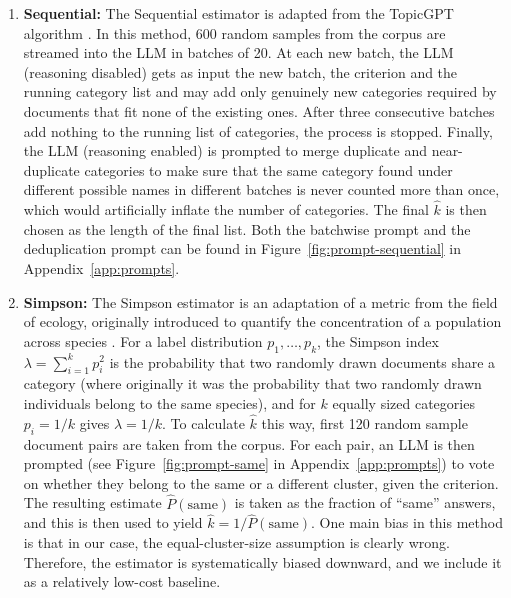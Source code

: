 \documentclass[11pt,a4paper,oneside]{report}
\begin{document}
\begin{enumerate}
From the pooled nine votes at each grid level, the share of ``no'' answers is calculated. This fraction represents the proportion of merges at that granularity the LLM considers ``unjustified''. This share is expected to be high at low $k$, where merges join unrelated categories, and low at high $k$, where merges join fragments of the same category.

Finally, a logistic curve of this fraction against $\log k$ is fitted and the final $\hat{k}$ is chosen to be the point where it crosses 50\% (which is then rounded and clipped to the nearest $k$ in the grid range). This $\hat{k}$ can therefore be thought of as the point between where the LLM believes the clustering is too granular and where it thinks it is not granular enough, which is by construction the point of optimal granularity.
\item \textbf{Sequential:} The Sequential estimator is adapted from the TopicGPT algorithm \citep{pham2024topicgpt}. In this method, 600 random samples from the corpus are streamed into the LLM in batches of 20. At each new batch, the LLM (reasoning disabled) gets as input the new batch, the criterion and the running category list and may add only genuinely new categories required by documents that fit none of the existing ones. After three consecutive batches add nothing to the running list of categories, the process is stopped. Finally, the LLM (reasoning enabled) is prompted to merge duplicate and near-duplicate categories to make sure that the same category found under different possible names in different batches is never counted more than once, which would artificially inflate the number of categories. The final $\hat{k}$ is then chosen as the length of the final list. Both the batchwise prompt and the deduplication prompt can be found in Figure~\ref{fig:prompt-sequential} in Appendix~\ref{app:prompts}.
\item \textbf{Simpson:} The Simpson estimator is an adaptation of a metric from the field of ecology, originally introduced to quantify the concentration of a population across species \citep{simpson1949measurement}. For a label distribution $p_1, \ldots, p_k$, the Simpson index $\lambda = \sum_{i=1}^{k} p_i^2$ is the probability that two randomly drawn documents share a category (where originally it was the probability that two randomly drawn individuals belong to the same species), and for $k$ equally sized categories $p_i = 1/k$ gives $\lambda = 1/k$. To calculate $\hat{k}$ this way, first 120 random sample document pairs are taken from the corpus. For each pair, an LLM is then prompted (see Figure~\ref{fig:prompt-same} in Appendix~\ref{app:prompts}) to vote on whether they belong to the same or a different cluster, given the criterion. The resulting estimate $\widehat{P}(\text{same})$ is taken as the fraction of ``same'' answers, and this is then used to yield $\hat{k} = 1/\widehat{P}(\text{same})$. One main bias in this method is that in our case, the equal-cluster-size assumption is clearly wrong. Therefore, the estimator is systematically biased downward, and we include it as a relatively low-cost baseline.

\end{enumerate}
\end{document}
